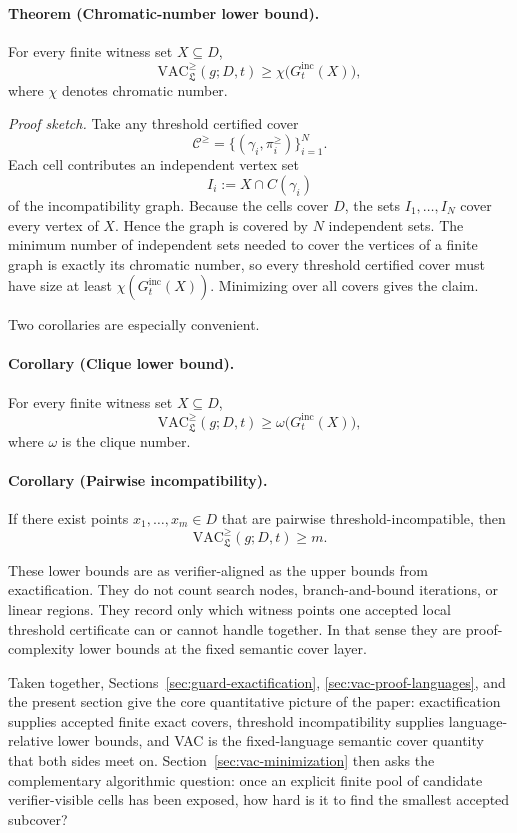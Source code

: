 \documentclass{article}
\begin{document}
\paragraph{Theorem (Chromatic-number lower bound).}
For every finite witness set $X\subseteq D$,
\[
\mathrm{VAC}^{\ge}_{\mathfrak L}(g;D,t)
\ge
\chi\bigl(G_t^{\mathrm{inc}}(X)\bigr),
\]
where $\chi$ denotes chromatic number.

\smallskip
\noindent\emph{Proof sketch.}
Take any threshold certified cover
\[
\mathcal C^{\ge}=\{(\gamma_i,\pi_i^{\ge})\}_{i=1}^N.
\]
Each cell contributes an independent vertex set
\[
I_i:=X\cap C(\gamma_i)
\]
of the incompatibility graph. Because the cells cover $D$, the sets $I_1,\dots,I_N$ cover every vertex of $X$. Hence the graph is covered by $N$ independent sets. The minimum number of independent sets needed to cover the vertices of a finite graph is exactly its chromatic number, so every threshold certified cover must have size at least $\chi(G_t^{\mathrm{inc}}(X))$. Minimizing over all covers gives the claim.

Two corollaries are especially convenient.

\paragraph{Corollary (Clique lower bound).}
For every finite witness set $X\subseteq D$,
\[
\mathrm{VAC}^{\ge}_{\mathfrak L}(g;D,t)
\ge
\omega\bigl(G_t^{\mathrm{inc}}(X)\bigr),
\]
where $\omega$ is the clique number.

\paragraph{Corollary (Pairwise incompatibility).}
If there exist points $x_1,\dots,x_m\in D$ that are pairwise threshold-incompatible, then
\[
\mathrm{VAC}^{\ge}_{\mathfrak L}(g;D,t)\ge m.
\]

These lower bounds are as verifier-aligned as the upper bounds from exactification. They do not count search nodes, branch-and-bound iterations, or linear regions. They record only which witness points one accepted local threshold certificate can or cannot handle together. In that sense they are proof-complexity lower bounds at the fixed semantic cover layer.

Taken together, Sections~\ref{sec:guard-exactification}, \ref{sec:vac-proof-languages}, and the present section give the core quantitative picture of the paper: exactification supplies accepted finite exact covers, threshold incompatibility supplies language-relative lower bounds, and VAC is the fixed-language semantic cover quantity that both sides meet on. Section~\ref{sec:vac-minimization} then asks the complementary algorithmic question: once an explicit finite pool of candidate verifier-visible cells has been exposed, how hard is it to find the smallest accepted subcover?
\end{document}
